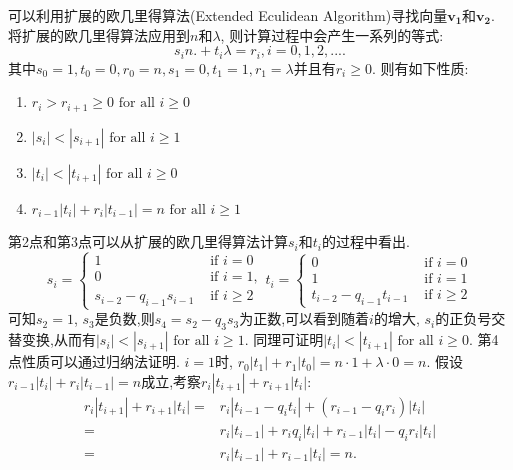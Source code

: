 \documentclass{article}
\begin{document}
可以利用扩展的欧几里得算法(Extended Eculidean Algorithm)寻找向量$\mathbf{v_1}$和$\mathbf{v_2}$.
将扩展的欧几里得算法应用到$n$和$\lambda$, 则计算过程中会产生一系列的等式:
\begin{equation}
\label{eq-eea}
s_i n. + t_i \lambda = r_i, i = 0, 1, 2, ....
\end{equation}
其中$s_0 = 1, t_0 = 0, r_0 = n, s_1 =0, t_1 = 1, r_1 = \lambda$并且有$r_i \ge 0$.
则有如下性质:
\begin{enumerate}
\item $r_i > r_{i+1} \ge 0 \text{ for all } i \ge 0$
\item $|s_i| < |s_{i+1}| \text{ for all } i \ge 1$
\item $|t_i| < |t_{i+1}| \text{ for all } i \ge 0$
\item $r_{i-1}|t_i| + r_i|t_{i-1}| = n \text{ for all } i \ge 1$
\end{enumerate}
第2点和第3点可以从扩展的欧几里得算法计算$s_i$和$t_i$的过程中看出.
\begin{equation}\nonumber
s_i = \left\{
\begin{array}{ll}
1 & \text{ if } i = 0 \\
0 & \text{ if } i = 1, \\
s_{i-2} - q_{i-1}s_{i-1} & \text{ if } i \ge 2 
\end{array}
\right. 
t_i = \left\{
\begin{array}{ll}
0 & \text{ if } i = 0 \\
1 & \text{ if } i = 1 \\
t_{i-2} - q_{i-1}t_{i-1} & \text{ if } i \ge 2 
\end{array}
\right.
\end{equation}
可知$s_2 = 1$, $s_3$是负数,则$s_4 = s_2 - q_3s_3$为正数,可以看到随着$i$的增大,
$s_i$的正负号交替变换,从而有$|s_i| < |s_{i+1}| \text{ for all } i \ge 1$.
同理可证明$|t_i| < |t_{i+1}| \text{ for all } i \ge 0$.
第4点性质可以通过归纳法证明. $i = 1$时, $r_0|t_1| + r_1|t_0| = n \cdot 1 + \lambda \cdot 0 = n$.
假设$r_{i-1}|t_i| + r_i|t_{i-1}| = n$成立,考察$r_{i}|t_{i+1}| + r_{i+1}|t_{i}|$:
\begin{equation}\nonumber
\begin{split}
r_{i}|t_{i+1}| + r_{i+1}|t_{i}| = & r_{i}|t_{i-1} - q_{i}t_{i}| + (r_{i-1}-q_{i}r_{i})|t_{i}| \\
= & r_i|t_{i-1}| + r_iq_i|t_i| + r_{i-1}|t_i| - q_ir_i|t_i|\\
= & r_i|t_{i-1}|+ r_{i-1}|t_i| = n.
\end{split}
\end{equation}
\end{document}
